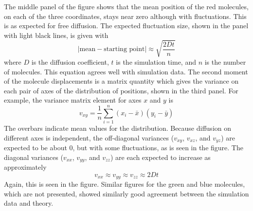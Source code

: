 \documentclass {book}
\begin{document}
The middle panel of the figure shows that the mean position of the red molecules, on each of the three coordinates, stays near zero although with fluctuations. This is as expected for free diffusion. The expected fluctuation size, shown in the panel with light black lines, is given with
$$|\textrm{mean}-\textrm{starting point}| \approx \sqrt{\frac{2Dt}{n}}$$
where $D$ is the diffusion coefficient, $t$ is the simulation time, and $n$ is the number of molecules. This equation agrees well with simulation data. The second moment of the molecule displacements is a matrix quantity which gives the variance on each pair of axes of the distribution of positions, shown in the third panel. For example, the variance matrix element for axes $x$ and $y$ is
$$v_{xy} = \frac{1}{n} \sum_{i=1}^{n} (x_i - \bar{x})(y_i - \bar{y})$$
The overbars indicate mean values for the distribution. Because diffusion on different axes is independent, the off-diagonal variances ($v_{xy}$, $v_{xz}$, and $v_{yz}$) are expected to be about 0, but with some fluctuations, as is seen in the figure. The diagonal variances ($v_{xx}$, $v_{yy}$, and $v_{zz}$) are each expected to increase as approximately
$$v_{xx} \approx v_{yy} \approx v_{zz} \approx 2Dt$$
Again, this is seen in the figure. Similar figures for the green and blue molecules, which are not presented, showed similarly good agreement between the simulation data and theory.
\end{document}
